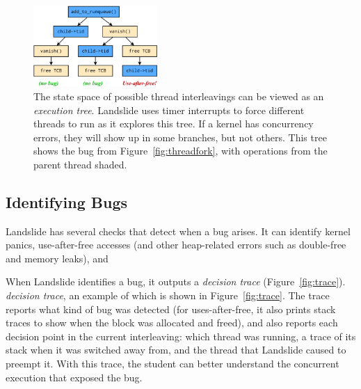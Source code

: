 \begin{figure}[t]
	\centering
\includegraphics[width=0.42\textwidth]{threadfork/threadfork.pdf}
\caption{The state space of possible thread interleavings can be viewed as an {\em execution tree}.
Landslide uses timer interrupts to force different threads to run as it explores this tree.
If a kernel has concurrency errors, they will show up in some branches, but not others.
This tree shows the bug from Figure~\ref{fig:threadfork}, with operations from the parent thread shaded.
}
\label{fig:tree}
\end{figure}

\subsection{Identifying Bugs}

Landslide has several checks that detect when a bug arises. It can identify kernel panics, use-after-free accesses (and other heap-related errors such as double-free and memory leaks), and

When Landslide identifies a bug, it outputs a
\shortversion
{{\em decision trace} (Figure~\ref{fig:trace}).}
{{\em decision trace}, an example of which is shown in Figure~\ref{fig:trace}.}
The trace reports what kind of bug was detected
\shortversion
{}
{(for uses-after-free, it also prints stack traces to show when the block was allocated and freed),}
and also reports each decision point in the current interleaving: which thread was running, a trace of its stack when it was switched away from, and the thread that Landslide caused to preempt it.
With this trace, the student can better understand the concurrent execution that exposed the bug.

